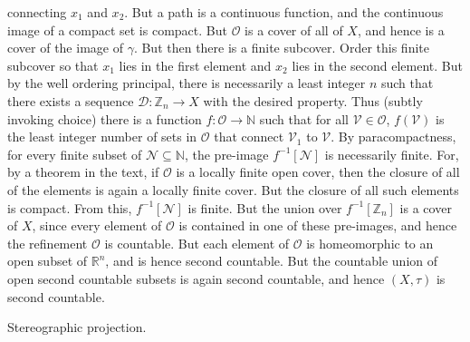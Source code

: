 \documentclass{article}                                                        %
\begin{document}
\begin{solution}
            connecting $x_{1}$ and $x_{2}$. But a path is a continuous function, and
            the continuous image of a compact set is compact. But $\mathcal{O}$ is a
            cover of all of $X$, and hence is a cover of the image of $\gamma$. But
            then there is a finite subcover. Order this finite subcover so that
            $x_{1}$ lies in the first element and $x_{2}$ lies in the second
            element. But by the well ordering principal, there is necessarily a
            least integer $n$ such that there exists a sequence
            $\mathcal{D}:\mathbb{Z}_{n}\rightarrow{X}$ with the desired property.
            Thus (subtly invoking choice) there is a function
            $f:\mathcal{O}\rightarrow\mathbb{N}$ such that for all
            $\mathcal{V}\in\mathcal{O}$, $f(\mathcal{V})$ is the least integer
            number of sets in $\mathcal{O}$ that connect $\mathcal{V}_{1}$ to
            $\mathcal{V}$. By paracompactness, for every finite subset of
            $\mathcal{N}\subseteq\mathbb{N}$, the pre-image
            $f^{\minus{1}}[\mathcal{N}]$ is necessarily finite. For, by a theorem in
            the text, if $\mathcal{O}$ is a locally finite open cover, then the
            closure of all of the elements is again a locally finite cover. But the
            closure of all such elements is compact. From this,
            $f^{\minus{1}}[\mathcal{N}]$ is finite. But the union over
            $f^{\minus{1}}[\mathbb{Z}_{n}]$ is a cover of $X$, since every element
            of $\mathcal{O}$ is contained in one of these pre-images, and hence
            the refinement $\mathcal{O}$ is countable. But each element of
            $\mathcal{O}$ is homeomorphic to an open subset of $\mathbb{R}^{n}$, and
            is hence second countable. But the countable union of open second
            countable subsets is again second countable, and hence $(X,\tau)$ is
            second countable.
        \end{solution}
        \begin{problem}
            Stereographic projection.
        \end{problem}
\end{document}

